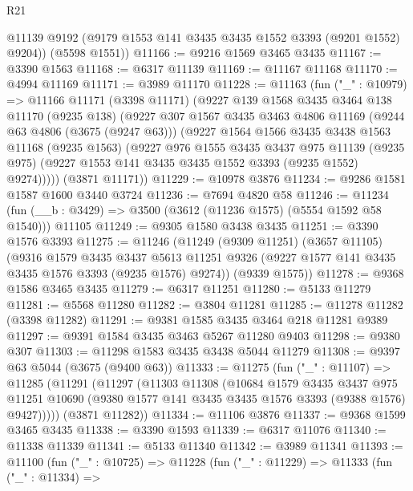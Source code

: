\begin{lexlean}{R21}
\begin{coremodule}
        @11139
        @9192
        (@9179 @1553 @141 @3435 @3435 @1552 @3393 (@9201 @1552) @9204))
      (@5598 @1551))
@11166 := @9216 @1569 @3465 @3435
@11167 := @3390 @1563
@11168 := @6317 @11139
@11169 := @11167 @11168
@11170 := @4994 @11169
@11171 := @3989 @11170
@11228 := @11163
    (fun ("_" : @10979) =>
    @11166
      @11171
      (@3398 @11171)
      (@9227
        @139
        @1568
        @3435
        @3464
        @138
        @11170
        (@9235 @138)
        (@9227
          @307
          @1567
          @3435
          @3463
          @4806
          @11169
          (@9244 @63 @4806 (@3675 (@9247 @63)))
          (@9227
            @1564
            @1566
            @3435
            @3438
            @1563
            @11168
            (@9235 @1563)
            (@9227
              @976
              @1555
              @3435
              @3437
              @975
              @11139
              (@9235 @975)
              (@9227 @1553 @141 @3435 @3435 @1552 @3393 (@9235 @1552) @9274)))))
      (@3871 @11171))
@11229 := @10978 @3876
@11234 := @9286 @1581 @1587 @1600 @3440 @3724
@11236 := @7694 @4820 @58
@11246 := @11234 (fun (__b : @3429) => @3500 (@3612 (@11236 @1575) (@5554 @1592 @58 @1540))) @11105
@11249 := @9305 @1580 @3438 @3435
@11251 := @3390 @1576 @3393
@11275 := @11246
    (@11249
      (@9309 @11251)
      (@3657 @11105)
      (@9316
        @1579
        @3435
        @3437
        @5613
        @11251
        @9326
        (@9227 @1577 @141 @3435 @3435 @1576 @3393 (@9235 @1576) @9274))
      (@9339 @1575))
@11278 := @9368 @1586 @3465 @3435
@11279 := @6317 @11251
@11280 := @5133 @11279
@11281 := @5568 @11280
@11282 := @3804 @11281
@11285 := @11278 @11282 (@3398 @11282)
@11291 := @9381 @1585 @3435 @3464 @218 @11281 @9389
@11297 := @9391 @1584 @3435 @3463 @5267 @11280 @9403
@11298 := @9380 @307
@11303 := @11298 @1583 @3435 @3438 @5044 @11279
@11308 := @9397 @63 @5044 (@3675 (@9400 @63))
@11333 := @11275
    (fun ("_" : @11107) =>
    @11285
      (@11291
        (@11297
          (@11303
            @11308
            (@10684
              @1579
              @3435
              @3437
              @975
              @11251
              @10690
              (@9380 @1577 @141 @3435 @3435 @1576 @3393 (@9388 @1576) @9427)))))
      (@3871 @11282))
@11334 := @11106 @3876
@11337 := @9368 @1599 @3465 @3435
@11338 := @3390 @1593
@11339 := @6317 @11076
@11340 := @11338 @11339
@11341 := @5133 @11340
@11342 := @3989 @11341
@11393 := @11100
    (fun ("_" : @10725) =>
    @11228
      (fun ("_" : @11229) =>
      @11333
        (fun ("_" : @11334) =>

\end{coremodule}
\end{lexlean}
